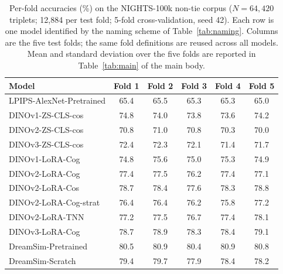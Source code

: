 \begin{table}[!ht]
\caption{Per-fold accuracies (\%) on the NIGHTS-100k non-tie corpus ($N{=}64{,}420$ triplets; 12{,}884 per test fold; 5-fold cross-validation, seed 42). Each row is one model identified by the naming scheme of Table~\ref{tab:naming}. Columns are the five test folds; the same fold definitions are reused across all models. Mean and standard deviation over the five folds are reported in Table~\ref{tab:main} of the main body.}
\label{tab:perfold}
\centering
\small
\begin{tabular}{lccccc}
\toprule
Model & Fold 1 & Fold 2 & Fold 3 & Fold 4 & Fold 5 \\
\midrule
LPIPS-AlexNet-Pretrained & 65.4 & 65.5 & 65.3 & 65.3 & 65.0 \\
DINOv1-ZS-CLS-cos & 74.8 & 74.0 & 73.8 & 73.6 & 74.2 \\
DINOv2-ZS-CLS-cos & 70.8 & 71.0 & 70.8 & 70.3 & 70.0 \\
DINOv3-ZS-CLS-cos & 72.4 & 72.3 & 72.1 & 71.4 & 71.7 \\
DINOv1-LoRA-Cog & 74.8 & 75.6 & 75.0 & 75.3 & 74.9 \\
DINOv2-LoRA-Cog & 77.4 & 77.5 & 76.2 & 77.4 & 77.1 \\
DINOv2-LoRA-Cos & 78.7 & 78.4 & 77.6 & 78.3 & 78.8 \\
DINOv2-LoRA-Cog-strat & 76.4 & 76.4 & 76.2 & 75.8 & 77.2 \\
DINOv2-LoRA-TNN & 77.2 & 77.5 & 76.7 & 77.4 & 78.1 \\
DINOv3-LoRA-Cog & 78.7 & 78.9 & 78.3 & 78.4 & 79.1 \\
DreamSim-Pretrained & 80.5 & 80.9 & 80.4 & 80.9 & 80.8 \\
DreamSim-Scratch & 79.4 & 79.7 & 77.9 & 78.4 & 78.2 \\
\bottomrule
\end{tabular}
\end{table}

\clearpage
{}
\vspace{1em}

